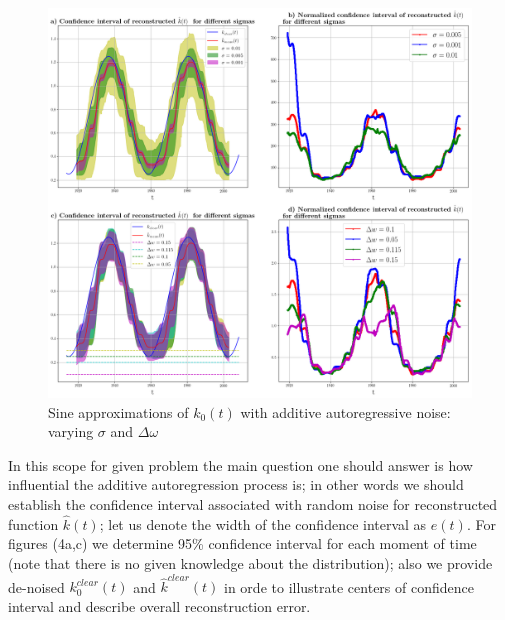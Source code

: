 \documentclass{ws-ijbc}
\begin{document}
\begin{figure}[!h]
\centering{}\includegraphics[width=1\textwidth]{../../../python/pics/v2/civ2}\caption{Sine approximations of $k_{0}(t)$ with additive autoregressive noise:
varying $\sigma$ and $\Delta\omega$\label{fig:ci}}
\end{figure}

In this scope for given problem the main question one should answer
is how influential the additive autoregression process is; in other
words we should establish the confidence interval associated with
random noise for reconstructed function $\hat{k}(t)$; let us denote
the width of the confidence interval as $e(t)$. For figures (4a,c)
we determine 95\% confidence interval for each moment of time (note
that there is no given knowledge about the distribution); also we
provide de-noised $k_{0}^{clear}(t)$ and $\hat{k}^{clear}(t)$ in
orde to illustrate centers of confidence interval and describe overall
reconstruction error.
\end{document}
